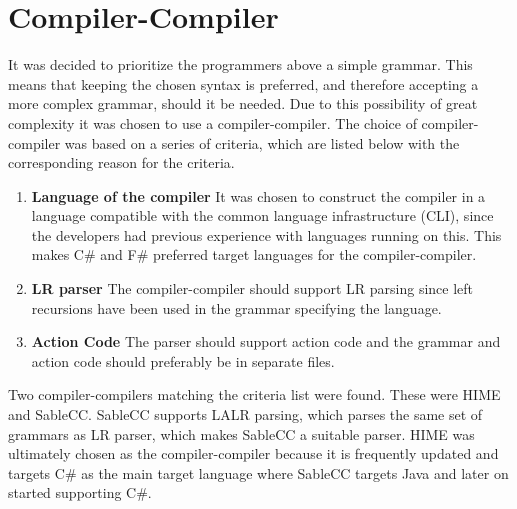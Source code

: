\section{Compiler-Compiler}
\label{sec:compiler_compiler_choice}

It was decided to prioritize the programmers above a simple grammar. This means that keeping the chosen syntax is preferred, and therefore accepting a more complex grammar, should it be needed. Due to this possibility of great complexity it was chosen to use a compiler-compiler. The choice of compiler-compiler was based on a series of criteria, which are listed below with the corresponding reason for the criteria.

\begin{enumerate}
\item \textbf{Language of the compiler} It was chosen to construct the compiler in a language compatible with the common language infrastructure (CLI), since the developers had previous experience with languages running on this. This makes C\# and F\# preferred target languages for the compiler-compiler.

\item \textbf{LR parser} The compiler-compiler should support LR parsing since left recursions have been used in the grammar specifying the language.\\

\item \textbf{Action Code} The parser should support action code and the grammar and action code should preferably be in separate files.\\

\end{enumerate}

Two compiler-compilers matching the criteria list were found. These were HIME and SableCC. SableCC supports LALR parsing, which parses the same set of grammars as LR parser, which makes SableCC a suitable parser. HIME was ultimately chosen as the compiler-compiler because it is frequently updated and targets C\# as the main target language where SableCC targets Java and later on started supporting C\#.
